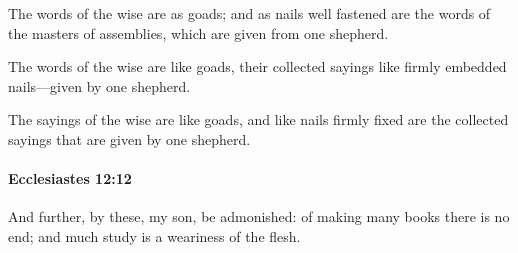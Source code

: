 			\begin{versebox}
					\item[BHS] 
					\item[LXX] 
					\item[ASV] The words of the wise are as goads; and as nails well fastened are the words of the masters of assemblies, which are given from one shepherd.
					\item[NIV] The words of the wise are like goads, their collected sayings like firmly embedded nails—given by one shepherd.
					\item[NRSV] The sayings of the wise are like goads, and like nails firmly fixed are the collected sayings that are given by one shepherd.
			\end{versebox}

		\paragraph{Ecclesiastes 12:12} %
			\label{ECCLESIASTES-12-12}

			And further, by these, my son, be admonished: of making many books there is no end; and much study is a weariness of the flesh.

